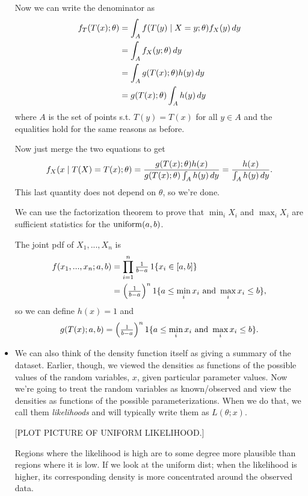 \begin{itemize}
  Now we can write the denominator as
  \begin{align*}
    f_T(T(x); \theta)
    &= \int_A f(T(y) \mid X = y; \theta) f_X(y) \,dy \\
    &= \int_A f_X(y; \theta) \,dy \\
    &= \int_A g(T(x); \theta) h(y) \,dy \\
    &= g(T(x); \theta) \int_A h(y) \,dy
  \end{align*}
  where $A$ is the set of points s.t. $T(y) = T(x)$ for all $y \in A$
  and the equalities hold for the same reasons as before.

  Now just merge the two equations to get
  \begin{equation*}
    f_X(x \mid T(X) = T(x); \theta)
    = \frac{g(T(x); \theta) h(x)}{g(T(x); \theta) \int_A h(y) \,dy}
    = \frac{h(x)}{\int_A h(y) \,dy}.
  \end{equation*}
  This last quantity does not depend on $\theta$, so we're done.

  We can use the factorization theorem to prove that $\min_i X_i$ and
  $\max_i X_i$ are sufficient statistics for the $\operatorname{uniform}(a,b)$.
  \begin{ex}
    The joint pdf of $X_1,...,X_n$ is
    \begin{align*}
      f(x_1,...,x_n; a, b)
      &= \prod_{i=1}^n \tfrac{1}{b-a} \operatorname{1}\{x_i \in [a,b]\} \\
      &= \Big(\tfrac{1}{b-a}\Big)^n \operatorname{1}\{a \leq \min_i x_i
         \text{ and } \max_i x_i \leq b\},
    \end{align*}
    so we can define $h(x) = 1$ and
    \begin{equation*}
      g(T(x); a, b) = \Big(\tfrac{1}{b-a}\Big)^n
        \operatorname{1}\{a \leq \min_i x_i \text{ and } \max_i x_i \leq b\}.
    \end{equation*}
  \end{ex}

\item We can also think of the density function itself as giving a
  summary of the dataset.
  Earlier, though, we viewed the densities as functions of the
  possible values of the random variables, $x$, given particular
  parameter values.  Now we're going to treat the random variables as
  known/observed and view the densities as functions of the possible
  parameterizations.  When we do that, we call them \emph{likelihoods}
  and will typically write them as $L(\theta; x)$.

  [PLOT PICTURE OF UNIFORM LIKELIHOOD.]

  Regions where the likelihood is high are to some degree more
  plausible than regions where it is low.  If we look at the uniform
  dist; when the likelihood is higher, its corresponding density is
  more concentrated around the observed data.

\end{itemize}

